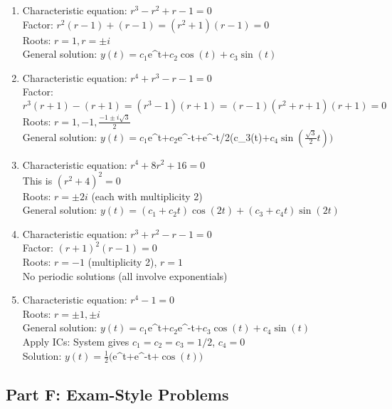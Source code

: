 \documentclass[12pt]{article}
\begin{document}
\begin{enumerate}[resume]
\item Characteristic equation: $r^3 - r^2 + r - 1 = 0$\\
Factor: $r^2(r-1) + (r-1) = (r^2+1)(r-1) = 0$\\
Roots: $r = 1, r = \pm i$\\
General solution: $y(t) = c_1$e^t$ + c_2\cos(t) + c_3\sin(t)$

\item Characteristic equation: $r^4 + r^3 - r - 1 = 0$\\
Factor: $r^3(r+1) - (r+1) = (r^3-1)(r+1) = (r-1)(r^2+r+1)(r+1) = 0$\\
Roots: $r = 1, -1, \frac{-1 \pm i\sqrt{3}}{2}$\\
General solution: $y(t) = c_1$e^t$ + c_2$e^{-t}$ + $e^{-t/2}(c_3\cos(t)$ + c_4\sin(\frac{\sqrt{3}}{2}t))$

\item Characteristic equation: $r^4 + 8r^2 + 16 = 0$\\
This is $(r^2 + 4)^2 = 0$\\
Roots: $r = \pm 2i$ (each with multiplicity 2)\\
General solution: $y(t) = (c_1 + c_2t)\cos(2t) + (c_3 + c_4t)\sin(2t)$

\item Characteristic equation: $r^3 + r^2 - r - 1 = 0$\\
Factor: $(r+1)^2(r-1) = 0$\\
Roots: $r = -1$ (multiplicity 2), $r = 1$\\
No periodic solutions (all involve exponentials)

\item Characteristic equation: $r^4 - 1 = 0$\\
Roots: $r = \pm 1, \pm i$\\
General solution: $y(t) = c_1$e^t$ + c_2$e^{-t}$ + c_3\cos(t) + c_4\sin(t)$\\
Apply ICs: System gives $c_1 = c_2 = c_3 = 1/2$, $c_4 = 0$\\
Solution: $y(t) = \frac{1}{2}($e^t$ + $e^{-t}$ + \cos(t))$
\end{enumerate}

\subsection*{Part F: Exam-Style Problems}
\end{document}
